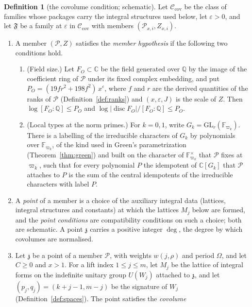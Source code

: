 \documentclass[11pt]{amsbook}
\theoremstyle{plain}
\theoremstyle{definition}
\newtheorem{definition}[theorem]{Definition}
\theoremstyle{remark}
\numberwithin{equation}{section}
\numberwithin{figure}{chapter}
\numberwithin{table}{chapter}
\newcommand{\Q}{\mathbb{Q}}
\renewcommand{\C}{\mathbb{C}}
\newcommand{\F}{\mathbb{F}}
\newcommand{\eps}{\varepsilon}
\newcommand{\Fam}{\mathfrak{F}}
\begin{document}
\begin{definition}[the covolume condition; schematic]
\label{def:covolume-condition}
Let $\mathcal C_{\mathrm{cov}}$ be the class of families whose
packages carry the integral structures used below, let $\eps>0$, and
let $\Fam$ be a family at $\eps$ in $\mathcal C_{\mathrm{cov}}$ with members
$(\mathcal P_{x,i},Z_{x,i})$.
\begin{enumerate}[label=(\arabic*)]
\item\label{item:cc-member}
A member $(\mathcal P,Z)$ satisfies the \emph{member hypothesis}
if the following two conditions hold.
\begin{enumerate}[label=(\alph*)]
\item (Field size.) Let $F_O\subset\C$ be the field generated over
$\Q$ by the image of the coefficient ring of $\mathcal P$ under its
fixed complex embedding, and put $P_O=(19fr^2+198f^2)\,x^\eps$,
where $f$ and $r$ are the derived quantities of the ranks of
$\mathcal P$ (Definition~\ref{def:ranks}) and $(x,\eps,J)$ is the
scale of $Z$. Then $\log[F_O:\Q]\le P_O$ and
$\log|\operatorname{disc}F_O|/[F_O:\Q]\le P_O$.
\item (Local types at the norm primes.) For $k=0,1$, write
$G_k=\mathrm{GL}_r(\F_{\varpi_k})$. There is a labelling of the
irreducible characters of $G_k$ by polynomials over
$\F_{\varpi_k}$, of the kind used in Green's parametrization
(Theorem~\ref{thm:green}) and built on the character of
$\F_{\varpi_k}^\times$ that $\mathcal P$ fixes at $\varpi_k$, such
that for every polynomial $P$ the idempotent of $\C[G_k]$ that
$\mathcal P$ attaches to $P$ is the sum of the central idempotents
of the irreducible characters with label $P$.
\end{enumerate}
\item A \emph{point} of a member is a choice of the auxiliary integral
data (lattices, integral structures and constants) at which the
lattices $M_j$ below are formed, and the \emph{point conditions} are
compatibility conditions on such a choice; both are schematic. A
point $\mathfrak z$ carries a positive integer $\deg$, the degree by
which covolumes are normalised.
\item\label{item:cc-ineq}
Let $\mathfrak z$ be a point of a member $\mathcal P$, with weights
$w(j,\rho)$ and period $\Omega$, and let $C\ge0$ and $x>1$. For a lift
index $1\le j\le m$, let $M_j$ be the lattice of integral forms on the
indefinite unitary group $U(W_j)$ attached to $\mathfrak z$, and let
$(p_j,q_j)=(k+j-1,m-j)$ be the signature of $W_j$
(Definition~\ref{def:spaces}). The point satisfies the \emph{covolume
}
\end{enumerate}
\end{definition}
\end{document}
